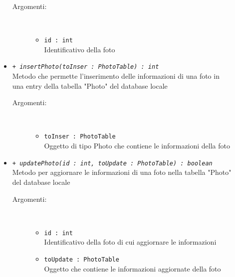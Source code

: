 \documentclass[../DefinizioneDiProdotto.tex]{subfiles}
\begin{document}
\begin{description}
\begin{itemize}
\begin{description}
			\item[Argomenti:] \
			\begin{itemize}
				\item \texttt{id : int}\\
				Identificativo della foto\end{itemize}
		\end{description}
		\item \texttt{+ \textit{insertPhoto(toInser : PhotoTable) : int}}\\
		Metodo che permette l'inserimento delle informazioni di una foto in una entry della tabella "Photo" del database locale
		\begin{description}
			\item[Argomenti:] \
			\begin{itemize}
				\item \texttt{toInser : PhotoTable}\\
				Oggetto di tipo Photo che contiene le informazioni della foto\end{itemize}
		\end{description}
		\item \texttt{+ \textit{updatePhoto(id : int, toUpdate : PhotoTable) : boolean}}\\
		Metodo per aggiornare le informazioni di una foto nella tabella "Photo" del database locale
		\begin{description}
			\item[Argomenti:] \
			\begin{itemize}
				\item \texttt{id : int}\\
				Identificativo della foto di cui aggiornare le informazioni\item \texttt{toUpdate : PhotoTable}\\
				Oggetto che contiene le informazioni aggiornate della foto\end{itemize}
		\end{description}
	\end{itemize}
\end{description}
\end{document}
